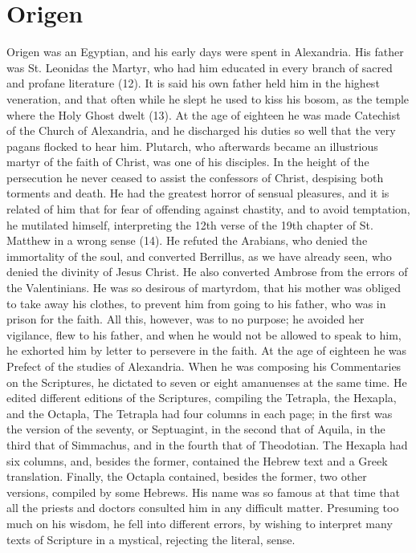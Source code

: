 \documentclass[12pt]{book}
\begin{document}
\section{Origen}
Origen was an Egyptian, and his early days were spent in Alexandria. His father was St. Leonidas the
Martyr, who had him educated in every branch of sacred and profane literature (12). It is said his own
father held him in the highest veneration, and that often while he slept he used to kiss his bosom, as the
temple where the Holy Ghost dwelt (13). At the age of eighteen he was made Catechist of the Church of
Alexandria, and he discharged his duties so well that the very pagans flocked to hear him. Plutarch, who
afterwards became an illustrious martyr of the faith of Christ, was one of his disciples. In the height of the
persecution he never ceased to assist the confessors of Christ, despising both torments and death. He had
the greatest horror of sensual pleasures, and it is related of him that for fear of offending against chastity,
and to avoid temptation, he mutilated himself, interpreting the 12th verse of the 19th chapter of St.
Matthew in a wrong sense (14). He refuted the Arabians, who denied the immortality of the soul, and
converted Berrillus, as we have already seen, who denied the divinity of Jesus Christ. He also converted
Ambrose from the errors of the Valentinians. He was so desirous of martyrdom, that his mother was
obliged to take away his clothes, to prevent him from going to his father, who was in prison for the faith.
All this, however, was to no purpose; he avoided her vigilance, flew to his father, and when he would not
be allowed to speak to him, he exhorted him by letter to persevere in the faith. At the age of eighteen he
was Prefect of the studies of Alexandria. When he was composing his Commentaries on the Scriptures, he
dictated to seven or eight amanuenses at the same time. He edited different editions of the Scriptures,
compiling the Tetrapla, the Hexapla, and the Octapla, The Tetrapla had four columns in each page; in the
first was the version of the seventy, or Septuagint, in the second that of Aquila, in the third that of
Simmachus, and in the fourth that of Theodotian. The Hexapla had six columns, and, besides the former,
contained the Hebrew text and a Greek translation. Finally, the Octapla contained, besides the former,
two other versions, compiled by some Hebrews. His name was so famous at that time that all the priests
and doctors consulted him in any difficult matter. Presuming too much on his wisdom, he fell into
different errors, by wishing to interpret many texts of Scripture in a mystical, rejecting the literal, sense.
\end{document}

